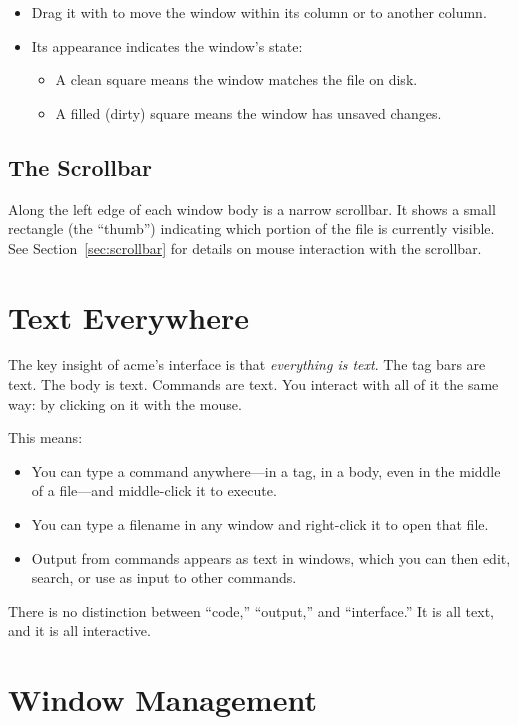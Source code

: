 \begin{itemize}
\item Drag it with  to move the window within its column or
      to another column.
\item Its appearance indicates the window's state:
  \begin{itemize}
  \item A clean square means the window matches the file on disk.
  \item A filled (dirty) square means the window has unsaved changes.
  \end{itemize}
\end{itemize}

\subsection{The Scrollbar}

Along the left edge of each window body is a narrow scrollbar.  It
shows a small rectangle (the ``thumb'') indicating which portion of the
file is currently visible.  See Section~\ref{sec:scrollbar} for details
on mouse interaction with the scrollbar.

\section{Text Everywhere}

The key insight of acme's interface is that \emph{everything is text}.
The tag bars are text.  The body is text.  Commands are text.  You
interact with all of it the same way: by clicking on it with the mouse.

This means:

\begin{itemize}
\item You can type a command anywhere---in a tag, in a body, even in
      the middle of a file---and middle-click it to execute.
\item You can type a filename in any window and right-click it to open
      that file.
\item Output from commands appears as text in windows, which you can
      then edit, search, or use as input to other commands.
\end{itemize}

There is no distinction between ``code,'' ``output,'' and ``interface.''
It is all text, and it is all interactive.

\section{Window Management}


